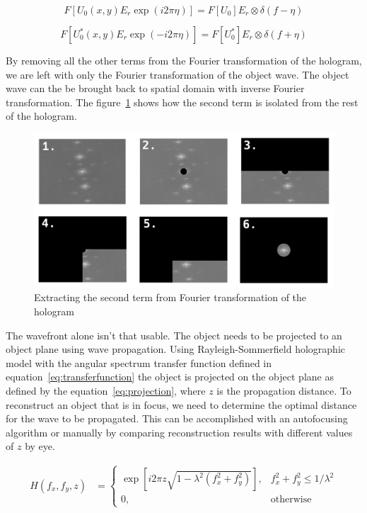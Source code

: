 \documentclass[12pt,a4paper,english
]{tunithesis}
\begin{document}
\begin{equation}
F [U_0(x, y)E_r \exp(i2\pi\eta)] = F [U_0] E_r \otimes \delta(f - \eta)
\label{eq:secondterm}
\end{equation}

\begin{equation}
F [U_0^*(x, y)E_r \exp(-i2\pi\eta)] = F [U_0^*] E_r \otimes \delta(f + \eta)
\label{eq:thirdterm}
\end{equation}

By removing all the other terms from the Fourier transformation of the hologram, we are left with only the Fourier transformation of the object wave. The object wave can the be brought back to spatial domain with inverse Fourier transformation. The figure~\ref{fig:fourierfiltering} shows how the second term is isolated from the rest of the hologram.

\begin{figure}
  \centering
  \includegraphics[width=\columnwidth]{img/filter_process.png}
  \caption{Extracting the second term from Fourier transformation of the hologram}
  \label{fig:fourierfiltering}
\end{figure}

The wavefront alone isn't that usable. The object needs to be projected to an object plane using wave propagation. Using Rayleigh-Sommerfield holographic model with the angular spectrum transfer function defined in equation~\ref{eq:transferfunction} the object is projected on the object plane as defined by the equation~\ref{eq:projection}, where $z$ is the propagation distance. To reconstruct an object that is in focus, we need to determine the optimal distance for the wave to be propagated. This can be accomplished with an autofocusing algorithm or manually by comparing reconstruction results with different values of $z$ by eye.

\begin{align}
H(f_x,f_y,z) &=
\begin{cases}
\exp[i2\pi z \sqrt{1 - \lambda^2 (f_x^2 + f_y^2)}],& f_x^2 + f_y^2 \leq 1/\lambda^2 \\
0, & \text{otherwise}
\end{cases} \label{eq:transferfunction}
\end{align}
\end{document}
